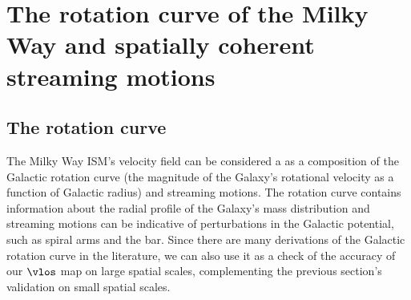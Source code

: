 \section{The rotation curve of the Milky Way and spatially coherent streaming motions}
\label{sec:rotation_curve}

\subsection{The rotation curve}
\label{sec:rotation_fit}
The Milky Way ISM's velocity field can be considered a as a composition of the Galactic rotation curve (the magnitude of the Galaxy's rotational velocity as a function of Galactic radius) and streaming motions. 
The rotation curve contains information about the radial profile of the Galaxy's mass distribution and streaming motions can be indicative of perturbations in the Galactic potential, such as spiral arms and the bar.
Since there are many derivations of the Galactic rotation curve in the literature, we can also use it as a check of the accuracy of our $\vlos$ map on large spatial scales, complementing the previous section's validation on small spatial scales.


